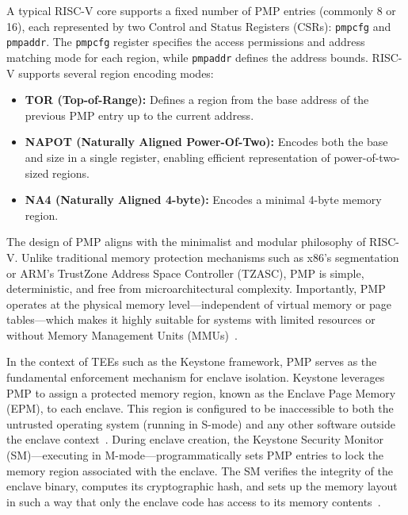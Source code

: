 A typical RISC-V core supports a fixed number of PMP entries (commonly 8 or 16), each represented by two Control and Status Registers (CSRs): \texttt{pmpcfg} and \texttt{pmpaddr}. The \texttt{pmpcfg} register specifies the access permissions and address matching mode for each region, while \texttt{pmpaddr} defines the address bounds. RISC-V supports several region encoding modes:

\begin{itemize}
    \item \textbf{TOR (Top-of-Range):} Defines a region from the base address of the previous PMP entry up to the current address.
    \item \textbf{NAPOT (Naturally Aligned Power-Of-Two):} Encodes both the base and size in a single register, enabling efficient representation of power-of-two-sized regions.
    \item \textbf{NA4 (Naturally Aligned 4-byte):} Encodes a minimal 4-byte memory region.
\end{itemize}

The design of PMP aligns with the minimalist and modular philosophy of RISC-V. Unlike traditional memory protection mechanisms such as x86's segmentation or ARM's TrustZone Address Space Controller (TZASC), PMP is simple, deterministic, and free from microarchitectural complexity. Importantly, PMP operates at the physical memory level—independent of virtual memory or page tables—which makes it highly suitable for systems with limited resources or without Memory Management Units (MMUs)~\cite{riscvprivspec,Survey2023}.

In the context of TEEs such as the Keystone framework, PMP serves as the fundamental enforcement mechanism for enclave isolation. Keystone leverages PMP to assign a protected memory region, known as the Enclave Page Memory (EPM), to each enclave. This region is configured to be inaccessible to both the untrusted operating system (running in S-mode) and any other software outside the enclave context~\cite{dayeol2019keystone}. During enclave creation, the Keystone Security Monitor (SM)—executing in M-mode—programmatically sets PMP entries to lock the memory region associated with the enclave. The SM verifies the integrity of the enclave binary, computes its cryptographic hash, and sets up the memory layout in such a way that only the enclave code has access to its memory contents~\cite{lee2019keystone,keystone2025how}.

